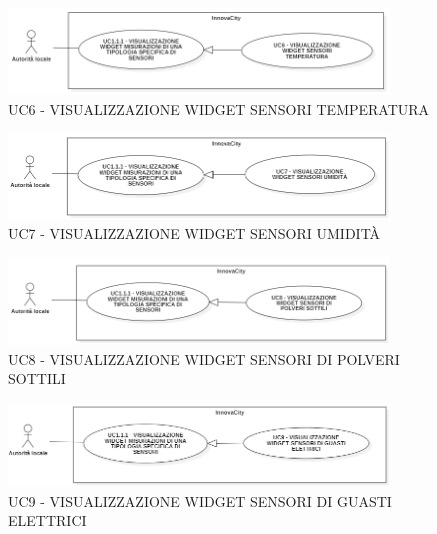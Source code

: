 


\begin{figure}[H]
    \centering
    \includegraphics[width=0.9\textwidth]{../Images/uc6.png}
    \caption{UC6 - VISUALIZZAZIONE WIDGET SENSORI TEMPERATURA }
    \label{fig:UC6}
\end{figure}




\begin{figure}[H]
    \centering
    \includegraphics[width=0.9\textwidth]{../Images/uc7.png}
    \caption{UC7 - VISUALIZZAZIONE WIDGET SENSORI UMIDITÀ }
\end{figure}




\begin{figure}[H]
    \centering
    \includegraphics[width=0.9\textwidth]{../Images/uc8.PNG}
    \caption{UC8 - VISUALIZZAZIONE WIDGET SENSORI DI POLVERI SOTTILI }
\end{figure}



\begin{figure}[H]
    \centering
    \includegraphics[width=0.9\textwidth]{../Images/uc9.png}
    \caption{UC9 - VISUALIZZAZIONE WIDGET SENSORI DI GUASTI ELETTRICI }
\end{figure}

